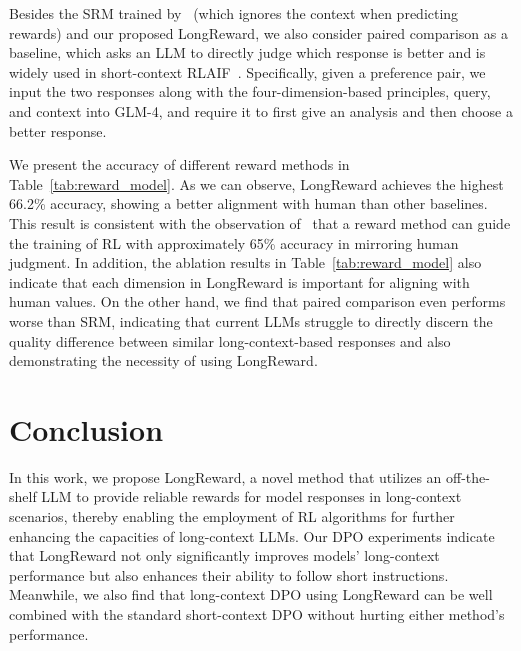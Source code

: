 Besides the SRM trained by~\citet{chatglm-rlhf} (which ignores the context when predicting rewards) and our proposed LongReward, we also consider paired comparison as a baseline, which asks an LLM to directly judge which response is better and is widely used in short-context RLAIF~\cite{constitutionalAI, rlaif}. Specifically, given a preference pair, we input the two responses along with the four-dimension-based principles, query, and context into GLM-4, and require it to first give an analysis and then choose a better response. 

We present the accuracy of different reward methods in Table~\ref{tab:reward_model}. As we can observe, LongReward achieves the highest 66.2\% accuracy, showing a better alignment with human than other baselines. This result is consistent with the observation of~\citet{chatglm-rlhf} that a reward method can guide the training of RL with approximately 65\% accuracy in mirroring human judgment. In addition, the ablation results in Table~\ref{tab:reward_model} also indicate that each dimension in LongReward is important for aligning with human values. On the other hand, we find that paired comparison even performs worse than SRM, indicating that current LLMs struggle to directly discern the quality difference between similar long-context-based responses and also demonstrating the necessity of using LongReward.

\section{Conclusion}
In this work, we propose LongReward, a novel method that utilizes an off-the-shelf LLM to provide reliable rewards for model responses in long-context scenarios, thereby enabling the employment of RL algorithms for further enhancing the capacities of long-context LLMs. Our DPO experiments indicate that LongReward not only significantly improves models' long-context performance but also enhances their ability to follow short instructions. Meanwhile, we also find that long-context DPO using LongReward can be well combined with the standard short-context DPO without hurting either method's performance.

